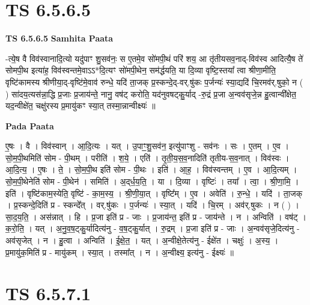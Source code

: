 \documentclass[17pt]{extarticle}
\begin{document}

\section{ TS 6.5.6.5 }

\textbf{TS 6.5.6.5 } \newline
\textbf{Samhita Paata} \newline

-त्ये॒ष वै विव॑स्वानादि॒त्यो यदु॑पाꣳ शु॒सव॑नः॒ स ए॒तमे॒व सो॑मपी॒थं परि॑ शय॒ आ तृ॑तीयसव॒नाद्-विव॑स्व आदित्यै॒ष ते॑ सोमपी॒थ इत्या॑ह॒ विव॑स्वन्तमे॒वाऽऽ*दि॒त्यꣳ सो॑मपी॒थेन॒ सम॑र्द्धयति॒ या दि॒व्या वृष्टि॒स्तया᳚ त्वा श्रीणा॒मीति॒ वृष्टि॑कामस्य श्रीणीया॒द्-वृष्टि॑मे॒वाव॑ रुन्धे॒ यदि॑ ता॒जक् प्र॒स्कन्दे॒द्-वर्.षु॑कः प॒र्जन्यः॑ स्या॒द्यदि॑ चि॒रमव॑र्.षुको॒ न ( ) सा॑दय॒त्यस॑न्ना॒द्धि प्र॒जाः प्र॒जाय॑न्ते॒ नानु॒ वष॑ट् करोति॒ यद॑नुवषट्कु॒र्याद् -रु॒द्रं प्र॒जा अ॒न्वव॑सृजे॒न्न हु॒त्वान्वी᳚क्षेत॒ यद॒न्वीक्षे॑त॒ चक्षु॑रस्य प्र॒मायु॑कꣳ स्या॒त् तस्मा॒न्नान्वीक्ष्यः॑ ॥ \newline

\textbf{Pada Paata} \newline

ए॒षः । वै । विव॑स्वान् । आ॒दि॒त्यः । यत् । उ॒पाꣳ॒॒शु॒सव॑न॒ इत्यु॑पाꣳशु - सव॑नः । सः । ए॒तम् । ए॒व । सो॒म॒पी॒थमिति॑ सोम - पी॒थम् । परीति॑ । श॒ये॒ । एति॑ । तृ॒ती॒य॒स॒व॒नादिति॑ तृतीय-स॒व॒नात् । विव॑स्वः । आ॒दि॒त्य॒ । ए॒षः । ते॒ । सो॒म॒पी॒थ इति॑ सोम - पी॒थः । इति॑ । आ॒ह॒ । विव॑स्वन्तम् । ए॒व । आ॒दि॒त्यम् । सो॒म॒पी॒थेनेति॑ सोम - पी॒थेन॑ । समिति॑ । अ॒द्‌र्ध॒य॒ति॒ । या । दि॒व्या । वृष्टिः॑ । तया᳚ । त्वा॒ । श्री॒णा॒मि॒ । इति॑ । वृष्टि॑काम॒स्येति॒ वृष्टि॑ - का॒म॒स्य॒ । श्री॒णी॒या॒त् । वृष्टि᳚म् । ए॒व । अवेति॑ । रु॒न्धे॒ । यदि॑ । ता॒जक् । प्र॒स्कन्दे॒दिति॑ प्र - स्कन्दे᳚त् । वर्.षु॑कः । प॒र्जन्यः॑ । स्या॒त् । यदि॑ । चि॒रम् । अव॑र्.षुकः । न ( ) । सा॒द॒य॒ति॒ । अस॑न्नात् । हि । प्र॒जा इति॑ प्र - जाः । प्र॒जाय॑न्त॒ इति॑ प्र - जाय॑न्ते । न । अन्विति॑ । वष॑ट् । क॒रो॒ति॒ । यत् । अ॒नु॒व॒ष॒ट्कु॒र्यादित्य॑नु - व॒ष॒ट्कु॒र्यात् । रु॒द्रम् । प्र॒जा इति॑ प्र - जाः । अ॒न्वव॑सृजे॒दित्य॑नु - अव॑सृजेत् । न । हु॒त्वा । अन्विति॑ । ई॒क्षे॒त॒ । यत् । अ॒न्वीक्षे॒तेत्य॑नु - ईक्षे॑त । चक्षुः॑ । अ॒स्य॒ । प्र॒मायु॑क॒मिति॑ प्र - मायु॑कम् । स्या॒त् । तस्मा᳚त् । न । अ॒न्वीक्ष्य॒ इत्य॑नु - ईक्ष्यः॑ ॥  \newline





\section{ TS 6.5.7.1 }
\end{document}

